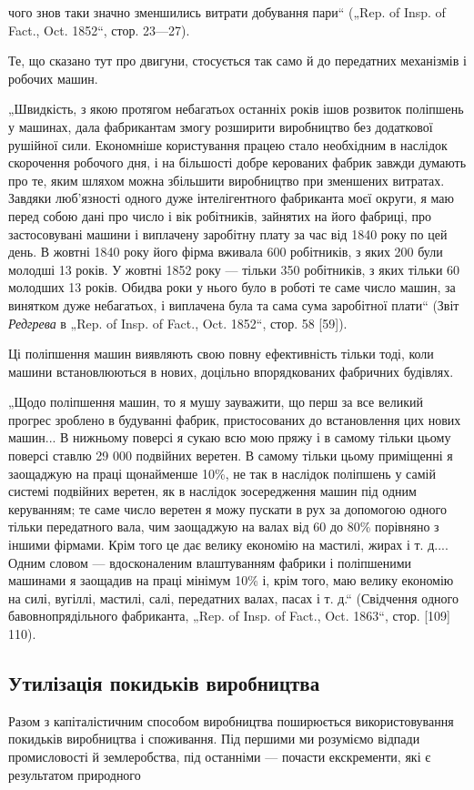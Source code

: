 \parcont{}  %
чого знов таки значно зменшились витрати добування пари“
(„Rep. of Insp. of Fact., Oct. 1852“, стор. 23—27).

Те, що сказано тут про двигуни, стосується так само й до
передатних механізмів і робочих машин.

„Швидкість, з якою протягом небагатьох останніх років
ішов розвиток поліпшень у машинах, дала фабрикантам змогу
розширити виробництво без додаткової рушійної сили. Економніше користування працею стало необхідним
в наслідок скорочення робочого дня, і на більшості добре керованих фабрик завжди думають про те,
яким шляхом можна збільшити
виробництво при зменшених витратах. Завдяки люб’язності одного
дуже інтелігентного фабриканта моєї округи, я маю перед собою дані про число і вік робітників,
зайнятих на його фабриці,
про застосовувані машини і виплачену заробітну плату за час
від 1840 року по цей день. В жовтні 1840 року його фірма
вживала 600 робітників, з яких 200 були молодші 13 років.
У жовтні 1852 року — тільки 350 робітників, з яких тільки 60
молодших 13 років. Обидва роки у нього було в роботі те саме
число машин, за винятком дуже небагатьох, і виплачена була та
сама сума заробітної плати“ (Звіт \emph{Редгрева} в „Rep. of Insp. of
Fact., Oct. 1852“, стор. 58 [59]).

Ці поліпшення машин виявляють свою повну ефективність
тільки тоді, коли машини встановлюються в нових, доцільно
впорядкованих фабричних будівлях.

„Щодо поліпшення машин, то я мушу зауважити, що перш
за все великий прогрес зроблено в будуванні фабрик, пристосованих до встановлення цих нових машин...
В нижньому поверсі
я сукаю всю мою пряжу і в самому тільки цьому поверсі
ставлю 29 000 подвійних веретен. В самому тільки цьому приміщенні я заощаджую на праці щонайменше
10\%, не так в наслідок поліпшень у самій системі подвійних веретен, як в наслідок зосередження машин
під одним керуванням; те саме число
веретен я можу пускати в рух за допомогою одного тільки
передатного вала, чим заощаджую на валах від 60 до 80\% порівняно з іншими фірмами. Крім того це дає
велику економію
на мастилі, жирах і т. д.... Одним словом — вдосконаленим
влаштуванням фабрики і поліпшеними машинами я заощадив на
праці мінімум 10\% і, крім того, маю велику економію на силі,
вугіллі, мастилі, салі, передатних валах, пасах і т. д.“ (Свідчення
одного бавовнопрядільного фабриканта, „Rep. of Insp. of Fact.,
Oct. 1863“, стор. [109] 110).

\subsection{Утилізація покидьків виробництва}

Разом з капіталістичним способом виробництва поширюється
використовування покидьків виробництва і споживання. Під першими ми розуміємо відпади промисловості
й землеробства, під
останніми — почасти екскременти, які є результатом природного
\parbreak{}  %
